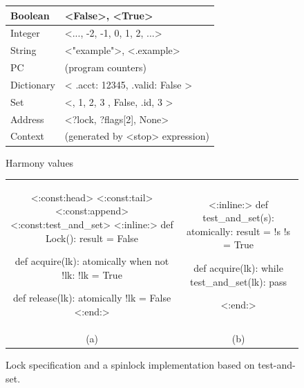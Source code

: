 \documentclass[twocolumn]{article}
\begin{document}
\begin{figure}
\begin{tabular}{|l|l|}
\hline
Boolean & <{False}>, <{True}> \\
\hline
Integer & <{..., -2, -1, 0, 1, 2, ...}> \\
\hline
String & <{"example"}>, <{.example}> \\
\hline
PC & (program counters) \\
\hline
Dictionary & <{{ .acct: 12345, .valid: False }}> \\
\hline
Set & <{{}, { 1, 2, 3 }, { False, .id, 3 }}> \\
\hline
Address & <{?lock, ?flags[2], None}> \\
\hline
Context & (generated by <{stop}> expression) \\
\hline
\end{tabular}
\caption{Harmony values}
\label{fig:values}
\end{figure}

\begin{figure}[h]
\begin{center}
\begin{tabular}{cc}
{\footnotesize
\begin{tcolorbox}[width=0.45\linewidth]
<{:const:head}>
<{:const:tail}>
<{:const:append}>
<{:const:test_and_set}>
<{:inline:}>
def Lock():
    result = False

def acquire(lk):
    atomically when not !lk:
        !lk = True

def release(lk):
    atomically !lk = False
<{:end:}>
\end{tcolorbox}
}
&
{\footnotesize
\begin{tcolorbox}[width=0.45\linewidth]
<{:inline:}>
def test_and_set(s):
    atomically:
        result = !s
        !s = True

def acquire(lk):
    while test_and_set(lk):
        pass

<{:end:}>
\end{tcolorbox}
}
\\
(a) & (b)
\end{tabular}
\end{center}
\caption{Lock specification and a spinlock implementation based on
test-and-set.}
\label{fig:synch}
\end{figure}
\end{document}
